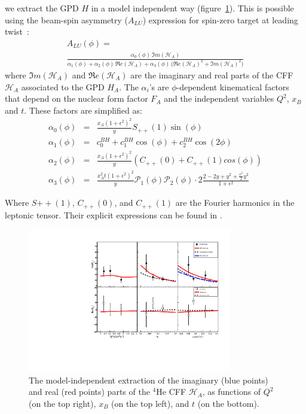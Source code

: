 \documentclass[nofootinbib,twocolumn,showpacs,prl,superscriptaddress,secnumarabic,amssymb,nobibnotes,aps,floatfix]{revtex4}
\begin{document}
we extract the GPD $H$ in a model independent way (figure~\ref{fig:CFF_HA}).  
This is possible using the beam-spin asymmetry ($A_{LU}$) expression for 
spin-zero target at leading twist~\cite{BM_2009}:
\small
\begin{equation}
\begin{split}
A_{LU}(\phi) =~~~~~~~~~~~~~~~~~~~~~~~~~~~~~~~~~~~~~~~~~~~~~~~~~~~~~~~~~\\
 \frac{\alpha_{0}(\phi) \, \Im m(\mathcal{H}_{A})}
{\alpha_{1}(\phi) + \alpha_{2}(\phi) \, \Re e(\mathcal{H}_{A}) + \alpha_{3}(\phi) \, 
\big( 
\Re e(\mathcal{H}_{A})^{2} + \Im m(\mathcal{H}_{A})^{2} \big)}
\label{eq:A_LU-coh}
\end{split}
\end{equation}
\normalsize
%
where $\Im m(\mathcal{H}_{A})$ and $\Re e(\mathcal{H}_{A})$ are the imaginary and real parts of the CFF $\mathcal{H}_{A}$ associated to the GPD $H_A$. The $\alpha_{i}$'s are $\phi$-dependent kinematical factors that depend on the nuclear form factor $F_A$ and the independent variables $Q^2$, $x_{B}$ and $t$. These factors are simplified as:
%
\small
\begin{eqnarray}
   \alpha_0 (\phi) & = &\frac{x_{A}(1+\epsilon^2)^2}{y} S_{++}(1) \sin(\phi)\\
    \alpha_1 (\phi) & = & c_0^{BH}+c_1^{BH} \cos({\phi})+c_2^{BH} \cos(2\phi)\\ 
   \alpha_2 (\phi) & = & \frac{x_{A}(1+\epsilon^2)^2}{y}  \left( C_{++}(0) +  
C_{++}(1) cos(\phi) \right)\\
\alpha_3 (\phi) &=& \frac{x^{2}_{A}t(1+\epsilon^2)^2}{y} {\mathcal P}_1(\phi) 
{\mathcal P}_2(\phi) \cdot 2 \frac{2-2y+y^2 + \frac{\epsilon^2}{2}y^2}{1 + 
\epsilon^2}
\end{eqnarray}
\normalsize
%

Where $S{++}(1)$, $C_{++}(0)$, and $C_{++}(1)$ are the Fourier harmonics in the 
leptonic tensor. Their explicit expressions can be found in .  



\begin{figure}[tb]
\includegraphics[width=8.9cm]{figs/Coherent_CFF.pdf}
\vspace{-0.9cm}
\caption{The model-independent extraction of the imaginary (blue points) and
real (red points) parts of the $^4$He CFF $\mathcal{H}_A$, as functions of
$Q^{2}$ (on the top right), $x_B$ (on the top left), and $t$ (on the bottom).}
\label{fig:CFF_HA}
\end{figure}
\end{document}
